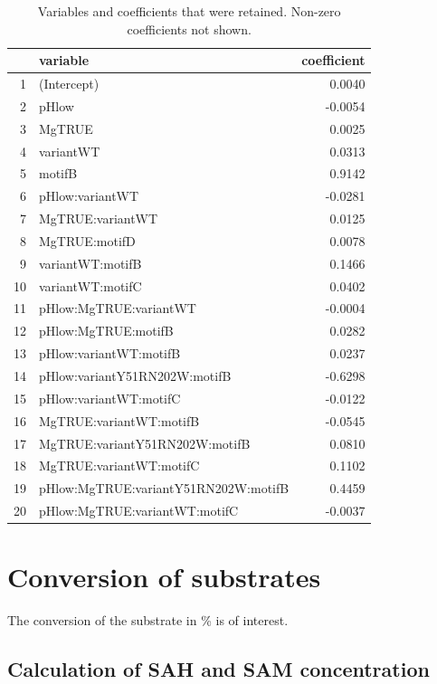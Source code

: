 \documentclass[]{tufte-handout}
\begin{document}
\begin{table}[ht]
\centering
\begin{tabular}{rlr}
  \toprule
 & variable & coefficient \\ 
  \midrule
1 & (Intercept) & 0.0040 \\ 
  2 & pHlow & -0.0054 \\ 
  3 & MgTRUE & 0.0025 \\ 
  4 & variantWT & 0.0313 \\ 
  5 & motifB & 0.9142 \\ 
  6 & pHlow:variantWT & -0.0281 \\ 
  7 & MgTRUE:variantWT & 0.0125 \\ 
  8 & MgTRUE:motifD & 0.0078 \\ 
  9 & variantWT:motifB & 0.1466 \\ 
  10 & variantWT:motifC & 0.0402 \\ 
  11 & pHlow:MgTRUE:variantWT & -0.0004 \\ 
  12 & pHlow:MgTRUE:motifB & 0.0282 \\ 
  13 & pHlow:variantWT:motifB & 0.0237 \\ 
  14 & pHlow:variantY51RN202W:motifB & -0.6298 \\ 
  15 & pHlow:variantWT:motifC & -0.0122 \\ 
  16 & MgTRUE:variantWT:motifB & -0.0545 \\ 
  17 & MgTRUE:variantY51RN202W:motifB & 0.0810 \\ 
  18 & MgTRUE:variantWT:motifC & 0.1102 \\ 
  19 & pHlow:MgTRUE:variantY51RN202W:motifB & 0.4459 \\ 
  20 & pHlow:MgTRUE:variantWT:motifC & -0.0037 \\ 
   \bottomrule
\end{tabular}
\caption{Variables and coefficients that were retained. Non-zero coefficients not shown.} 
\end{table}

\newpage

\section{Conversion of substrates}\label{conversion-of-substrates}

The conversion of the substrate in \% is of interest.

\subsection{Calculation of SAH and SAM
concentration}\label{calculation-of-sah-and-sam-concentration}
\end{document}
